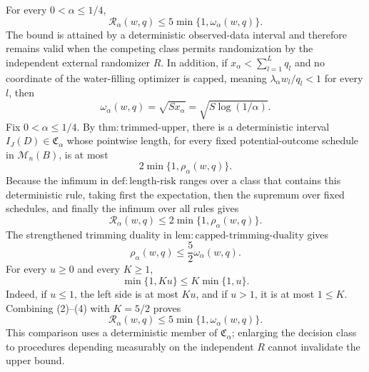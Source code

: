 For every \(0<\alpha\le 1/4\),
\[
 \mathcal R_\alpha(w,q)
 \le 5\min\{1,\omega_\alpha(w,q)\}.
\]
The bound is attained by a deterministic observed-data interval and therefore remains valid when the competing class permits randomization by the independent external randomizer \(R\).  In addition, if \(x_\alpha<\sum_{l=1}^Lq_l\) and no coordinate of the water-filling optimizer is capped, meaning \(\lambda_\alpha w_l/q_l<1\) for every \(l\), then
\[
 \omega_\alpha(w,q)=\sqrt{Sx_\alpha}
 =\sqrt{S\log(1/\alpha)}.
\]
Fix \(0<\alpha\le1/4\).  By \(\mathrm{thm{:}trimmed\text{-}upper}\), there is a deterministic interval \(I_J(D)\in\mathfrak C_\alpha\) whose pointwise length, for every fixed potential-outcome schedule in \(\mathcal M_n(B)\), is at most
\[
 2\min\{1,\rho_\alpha(w,q)\}.
\tag{1}
\]
Because the infimum in \(\mathrm{def{:}length\text{-}risk}\) ranges over a class that contains this deterministic rule, taking first the expectation, then the supremum over fixed schedules, and finally the infimum over all rules gives
\[
 \mathcal R_\alpha(w,q)
 \le 2\min\{1,\rho_\alpha(w,q)\}.
\tag{2}
\]
The strengthened trimming duality in \(\mathrm{lem{:}capped\text{-}trimming\text{-}duality}\) gives
\[
 \rho_\alpha(w,q)\le\frac52\omega_\alpha(w,q).
\tag{3}
\]
For every \(u\ge0\) and every \(K\ge1\),
\[
 \min\{1,Ku\}\le K\min\{1,u\}.
\tag{4}
\]
Indeed, if \(u\le1\), the left side is at most \(Ku\), and if \(u>1\), it is at most \(1\le K\).  Combining (2)--(4) with \(K=5/2\) proves
\[
 \mathcal R_\alpha(w,q)
 \le5\min\{1,\omega_\alpha(w,q)\}.
\tag{5}
\]
This comparison uses a deterministic member of \(\mathfrak C_\alpha\); enlarging the decision class to procedures depending measurably on the independent \(R\) cannot invalidate the upper bound.

